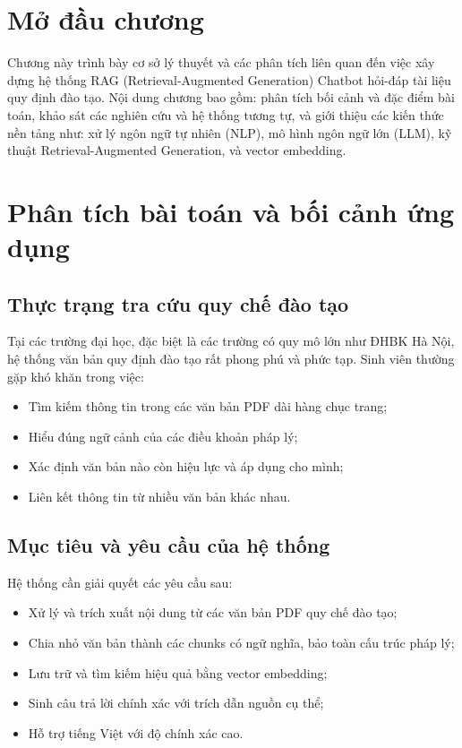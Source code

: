 \documentclass[../DoAn.tex]{subfiles}
\begin{document}
\section{Mở đầu chương}
Chương này trình bày cơ sở lý thuyết và các phân tích liên quan đến việc xây dựng hệ thống RAG (Retrieval-Augmented Generation) Chatbot hỏi-đáp tài liệu quy định đào tạo. Nội dung chương bao gồm: phân tích bối cảnh và đặc điểm bài toán, khảo sát các nghiên cứu và hệ thống tương tự, và giới thiệu các kiến thức nền tảng như: xử lý ngôn ngữ tự nhiên (NLP), mô hình ngôn ngữ lớn (LLM), kỹ thuật Retrieval-Augmented Generation, và vector embedding.

\section{Phân tích bài toán và bối cảnh ứng dụng}

\subsection{Thực trạng tra cứu quy chế đào tạo}
Tại các trường đại học, đặc biệt là các trường có quy mô lớn như ĐHBK Hà Nội, hệ thống văn bản quy định đào tạo rất phong phú và phức tạp. Sinh viên thường gặp khó khăn trong việc:
\begin{itemize}
    \item Tìm kiếm thông tin trong các văn bản PDF dài hàng chục trang;
    \item Hiểu đúng ngữ cảnh của các điều khoản pháp lý;
    \item Xác định văn bản nào còn hiệu lực và áp dụng cho mình;
    \item Liên kết thông tin từ nhiều văn bản khác nhau.
\end{itemize}

\subsection{Mục tiêu và yêu cầu của hệ thống}
Hệ thống cần giải quyết các yêu cầu sau:
\begin{itemize}
    \item Xử lý và trích xuất nội dung từ các văn bản PDF quy chế đào tạo;
    \item Chia nhỏ văn bản thành các chunks có ngữ nghĩa, bảo toàn cấu trúc pháp lý;
    \item Lưu trữ và tìm kiếm hiệu quả bằng vector embedding;
    \item Sinh câu trả lời chính xác với trích dẫn nguồn cụ thể;
    \item Hỗ trợ tiếng Việt với độ chính xác cao.
\end{itemize}
\end{document}
